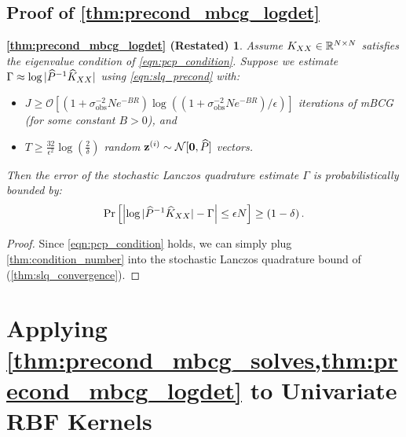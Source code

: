 \subsection{Proof of \cref{thm:precond_mbcg_logdet}}
\newtheorem*{thm:precond_mbcg_logdet}{\cref{thm:precond_mbcg_logdet} (Restated)}
\begin{thm:precond_mbcg_logdet}
  Assume $K_{XX} \in \mathbb{R}^{N \times N}$ satisfies the eigenvalue condition of \cref{eqn:pcp_condition}.
	Suppose we estimate $\Gamma \approx \log \vert \widehat{P}^{-1} \widehat{K}_{XX} \vert$ using \cref{eqn:slq_precond} with:
	\begin{itemize}
		\item $J \geq \mathcal{O} \left[ (1 + \sigma^{-2}_\text{obs} N e^{-BR}) \log \left( ( 1 + \sigma^{-2}_\text{obs} N e^{-BR} ) / \epsilon \right) \right]$ iterations of mBCG (for some constant $B > 0$), and
		\item $T \geq \frac{32}{\epsilon^2} \log \left( \frac 2 \delta \right)$ random $\bz^{(i)} \sim \normaldist{\bzero}{\trainP}$ vectors.
	\end{itemize}
  Then the error of the stochastic Lanczos quadrature estimate $\Gamma$ is probabilistically bounded by:
  \begin{equation*}
    \textrm{Pr}\left[\Bigl\vert \log \vert \widehat{P}^{-1} \widehat{K}_{XX} \vert - \Gamma \Bigr\vert \leq \epsilon N \right] \geq \left( 1 - \delta \right).
  \end{equation*}
\end{thm:precond_mbcg_logdet}

\begin{proof}
Since \cref{eqn:pcp_condition} holds, we can simply plug \cref{thm:condition_number} into the stochastic Lanczos quadrature bound of \citet{ubaru2017fast} (\cref{thm:slq_convergence}).
\end{proof}









\section{Applying \cref{thm:precond_mbcg_solves,thm:precond_mbcg_logdet} to Univariate RBF Kernels}

